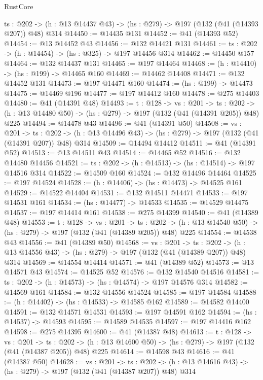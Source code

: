 \begin{lexlean}{RustCore}
\begin{coremodule}
  {ts : @202} -> (h : @13 @14437 @43) -> (hs : @279) -> @197 (@132 (@41 (@14393 @207)) @48) @314
@14450 := @14435 @131
@14452 := @41 (@14393 @52)
@14454 := @13 @14452 @43
@14456 := @132 @14421 @131
@14461 := {ts : @202} -> (h : @14454) -> (hs : @325) -> @197 @14456 @314
@14462 := @14450 @157
@14464 := @132 @14437 @131
@14465 := @197 @14464
@14468 := (h : @14410) -> (hs : @199) -> @14465 @160
@14469 := @14462 @14408
@14471 := @132 @14452 @131
@14473 := @197 @14471 @160
@14474 := (hs : @199) -> @14473
@14475 := @14469 @196
@14477 := @197 @14412 @160
@14478 := @275 @14403
@14480 := @41 (@14391 @48)
@14493 := {t : @128} ->
  {vs : @201} ->
  {ts : @202} -> (h : @13 @14480 @50) -> (hs : @279) -> @197 (@132 (@41 (@14391 @205)) @48) @225
@14494 := @14478 @43
@14496 := @41 (@14391 @50)
@14508 := {vs : @201} ->
  {ts : @202} -> (h : @13 @14496 @43) -> (hs : @279) -> @197 (@132 (@41 (@14391 @207)) @48) @314
@14509 := @14494 @14412
@14511 := @41 (@14391 @52)
@14513 := @13 @14511 @43
@14514 := @14465 @52
@14516 := @132 @14480 @14456
@14521 := {ts : @202} -> (h : @14513) -> (hs : @14514) -> @197 @14516 @314
@14522 := @14509 @160
@14524 := @132 @14496 @14464
@14525 := @197 @14524
@14528 := (h : @14406) -> (hs : @14473) -> @14525 @161
@14529 := @14522 @14404
@14531 := @132 @14511 @14471
@14533 := @197 @14531 @161
@14534 := (hs : @14477) -> @14533
@14535 := @14529 @14475
@14537 := @197 @14414 @161
@14538 := @275 @14399
@14540 := @41 (@14389 @48)
@14553 := {t : @128} ->
  {vs : @201} ->
  {ts : @202} -> (h : @13 @14540 @50) -> (hs : @279) -> @197 (@132 (@41 (@14389 @205)) @48) @225
@14554 := @14538 @43
@14556 := @41 (@14389 @50)
@14568 := {vs : @201} ->
  {ts : @202} -> (h : @13 @14556 @43) -> (hs : @279) -> @197 (@132 (@41 (@14389 @207)) @48) @314
@14569 := @14554 @14414
@14571 := @41 (@14389 @52)
@14573 := @13 @14571 @43
@14574 := @14525 @52
@14576 := @132 @14540 @14516
@14581 := {ts : @202} -> (h : @14573) -> (hs : @14574) -> @197 @14576 @314
@14582 := @14569 @161
@14584 := @132 @14556 @14524
@14585 := @197 @14584
@14588 := (h : @14402) -> (hs : @14533) -> @14585 @162
@14589 := @14582 @14400
@14591 := @132 @14571 @14531
@14593 := @197 @14591 @162
@14594 := (hs : @14537) -> @14593
@14595 := @14589 @14535
@14597 := @197 @14416 @162
@14598 := @275 @14395
@14600 := @41 (@14387 @48)
@14613 := {t : @128} ->
  {vs : @201} ->
  {ts : @202} -> (h : @13 @14600 @50) -> (hs : @279) -> @197 (@132 (@41 (@14387 @205)) @48) @225
@14614 := @14598 @43
@14616 := @41 (@14387 @50)
@14628 := {vs : @201} ->
  {ts : @202} -> (h : @13 @14616 @43) -> (hs : @279) -> @197 (@132 (@41 (@14387 @207)) @48) @314

\end{coremodule}
\end{lexlean}
